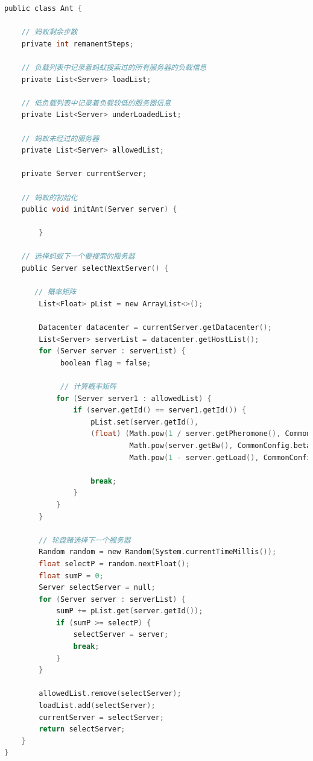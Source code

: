 \begin{lstlisting}[language=C,caption={蚂蚁实体},label=Code:java]
public class Ant {

    // 蚂蚁剩余步数
    private int remanentSteps;

    // 负载列表中记录着蚂蚁搜索过的所有服务器的负载信息
    private List<Server> loadList;

    // 低负载列表中记录着负载较低的服务器信息
    private List<Server> underLoadedList;

    // 蚂蚁未经过的服务器
    private List<Server> allowedList;

    private Server currentServer;

    // 蚂蚁的初始化
    public void initAnt(Server server) {
            
        }

    // 选择蚂蚁下一个要搜索的服务器
    public Server selectNextServer() {

       // 概率矩阵
        List<Float> pList = new ArrayList<>();

        Datacenter datacenter = currentServer.getDatacenter();
        List<Server> serverList = datacenter.getHostList();
        for (Server server : serverList) {
             boolean flag = false;

             // 计算概率矩阵
            for (Server server1 : allowedList) {
                if (server.getId() == server1.getId()) {
                    pList.set(server.getId(), 
                    (float) (Math.pow(1 / server.getPheromone(), CommonConfig.alpha) *
                             Math.pow(server.getBw(), CommonConfig.beta) *
                             Math.pow(1 - server.getLoad(), CommonConfig.rho) / sum));

                    break;
                }
            }
        }

        // 轮盘赌选择下一个服务器
        Random random = new Random(System.currentTimeMillis());
        float selectP = random.nextFloat();
        float sumP = 0;
        Server selectServer = null;
        for (Server server : serverList) {
            sumP += pList.get(server.getId());
            if (sumP >= selectP) {
                selectServer = server;
                break;
            }
        }

        allowedList.remove(selectServer);
        loadList.add(selectServer);
        currentServer = selectServer;
        return selectServer;
    }
}
\end{lstlisting}

